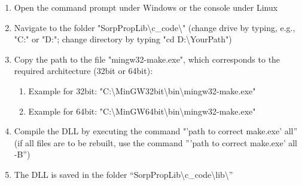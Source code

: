\begin{enumerate}
\begin{enumerate}
		\item Open the command prompt under Windows or the console under Linux
		\item Navigate to the folder "SorpPropLib\textbackslash c\_code\textbackslash" (change drive by typing, e.g., "C:" or "D:"; change directory by typing "cd D:\textbackslash YourPath")
		\item Copy the path to the file "mingw32-make.exe", which corresponds to the required architecture (32bit or 64bit):
		\begin{enumerate}
			\item Example for 32bit: "C:\textbackslash MinGW32bit\textbackslash bin\textbackslash mingw32-make.exe"
			\item Example for 64bit: "C:\textbackslash MinGW64bit\textbackslash bin\textbackslash mingw32-make.exe"
		\end{enumerate}
		\item Compile the DLL by executing the command "’path to correct make.exe’ all” (if all files are to be rebuilt, use the command ”’path to correct make.exe’ all -B”)
		\item The DLL is saved in the folder “SorpPropLib\textbackslash c\_code\textbackslash lib\textbackslash”
	\end{enumerate}
\end{enumerate}
%
